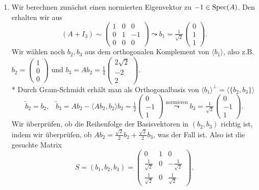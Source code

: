 \begin{enumerate}
	\item Wir berechnen zunächst einen normierten Eigenvektor zu \( -1 \in \text{Spec}(A) \). Den erhalten wir aus
	\begin{equation*}
		(A+I_3) \sim \left( \begin{smallmatrix}
			1 & 0 & 0 \\
			0 & 1 & -1 \\
			0 & 0 & 0
		\end{smallmatrix} \right) \leadsto b_1 = \tfrac{1}{\sqrt{2}}\left( \begin{smallmatrix}
			0 \\ 1 \\ 1
		\end{smallmatrix} \right)\text{.}
	\end{equation*}
	Wir wählen noch \( b_2, b_3 \) aus dem orthogonalen Komplement von \( \langle b_1 \rangle \), also z.B. \( b_2 = \left( \begin{smallmatrix}
		1 \\ 0 \\ 0
	\end{smallmatrix} \right) \) und \( b_3 = Ab_2 = \tfrac{1}{4}\left( \begin{smallmatrix}
		2\sqrt{2} \\ -2 \\ 2
	\end{smallmatrix} \right) \). \\* Durch Gram-Schmidt erhält man als Orthogonalbasis von \( \langle b_1 \rangle^\perp = \langle \{ b_2,b_3 \} \rangle \)
	\begin{equation*}
		\widetilde{b}_2 = b_2\text{,} \quad \widetilde{b}_3 = Ab_2 - \langle Ab_2,b_2 \rangle b_2 = \tfrac{1}{2}\left( \begin{smallmatrix}
			0 \\ -1 \\ 1
		\end{smallmatrix} \right) \overset{\text{normieren}}{\leadsto}b_3 = \tfrac{1}{\sqrt{2}}\left( \begin{smallmatrix}
			0 \\ -1 \\ 1
		\end{smallmatrix} \right)\text{.}
	\end{equation*}
	Wir überprüfen, ob die Reihenfolge der Basisvektoren in \( (b_2,b_3) \) richtig ist, indem wir überprüfen, ob \( Ab_2 = \tfrac{\sqrt{2}}{2}b_2 + \tfrac{\sqrt{2}}{2}b_3 \), was der Fall ist. Also ist die gesuchte Matrix
	\begin{equation*}
		S = (b_1,b_2,b_3) = \begin{pmatrix}
			0 & 1 & 0 \\
			\tfrac{1}{\sqrt{2}} & 0 & -\tfrac{1}{\sqrt{2}} \\
			\tfrac{1}{\sqrt{2}} & 0 & \tfrac{1}{\sqrt{2}}
		\end{pmatrix}\text{.}
	\end{equation*}
\end{enumerate}

